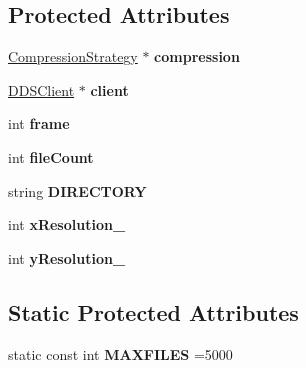 \subsection*{Protected Attributes}
\begin{DoxyCompactItemize}
\item 
\hypertarget{class_depth_source_aeda564a4cee4f9741fe44edb29982883}{\hyperlink{class_compression_strategy}{Compression\+Strategy} $\ast$ {\bfseries compression}}\label{class_depth_source_aeda564a4cee4f9741fe44edb29982883}

\item 
\hypertarget{class_depth_source_a24ca992b257e38717e9099f773eefd67}{\hyperlink{class_d_d_s_client}{D\+D\+S\+Client} $\ast$ {\bfseries client}}\label{class_depth_source_a24ca992b257e38717e9099f773eefd67}

\item 
\hypertarget{class_depth_source_a1ec315333dc0357859db36f281dcb568}{int {\bfseries frame}}\label{class_depth_source_a1ec315333dc0357859db36f281dcb568}

\item 
\hypertarget{class_depth_source_a7a1eb8572f2aa03d455f85a1b1709488}{int {\bfseries file\+Count}}\label{class_depth_source_a7a1eb8572f2aa03d455f85a1b1709488}

\item 
\hypertarget{class_depth_source_ac724a2f7d453e0ddad2e99bf3381f41f}{string {\bfseries D\+I\+R\+E\+C\+T\+O\+R\+Y}}\label{class_depth_source_ac724a2f7d453e0ddad2e99bf3381f41f}

\item 
\hypertarget{class_depth_source_a8682eac3aae4f214f9a33ff3ade2b1c7}{int {\bfseries x\+Resolution\+\_\+}}\label{class_depth_source_a8682eac3aae4f214f9a33ff3ade2b1c7}

\item 
\hypertarget{class_depth_source_a81392a74d51eb00a9b4abfa4a10938db}{int {\bfseries y\+Resolution\+\_\+}}\label{class_depth_source_a81392a74d51eb00a9b4abfa4a10938db}

\end{DoxyCompactItemize}
\subsection*{Static Protected Attributes}
\begin{DoxyCompactItemize}
\item 
\hypertarget{class_depth_source_a7da4336930cd7e2f5997bbb1b8bed5c7}{static const int {\bfseries M\+A\+X\+F\+I\+L\+E\+S} =5000}\label{class_depth_source_a7da4336930cd7e2f5997bbb1b8bed5c7}

\end{DoxyCompactItemize}


